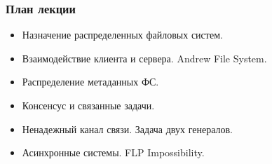 \begin{frame}
\frametitle{План лекции}
\begin{itemize}
  \item Назначение распределенных файловых систем.
  \item Взаимодействие клиента и сервера. Andrew File System.
  \item Распределение метаданных ФС.
  \item Консенсус и связанные задачи.
  \item Ненадежный канал связи. Задача двух генералов.
  \item Асинхронные системы. FLP Impossibility.
\end{itemize}
\end{frame}
